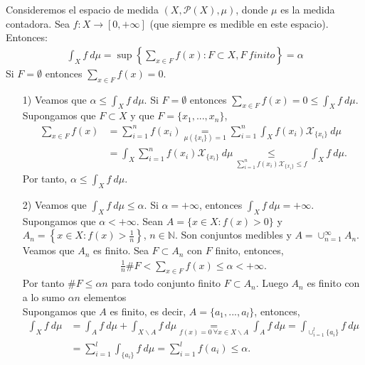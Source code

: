\begin{ejemplo}
Consideremos el espacio de medida $(X,\mathcal{P}(X),\mu)$, donde $\mu$ es la medida contadora. Sea $f: X \longrightarrow [0,+\infty]$ (que siempre es medible en este espacio). Entonces:
\begin{align*}
    \int_{X}{f \ d\mu} = \sup{\left\{ \sum_{x \in F}{f(x)} : F \subset X, F \ finito \right\}} = \alpha
\end{align*}
Si $F = \emptyset$ entonces $\sum_{x \in F}{f(x)} = 0$.
\begin{enumerate}
    \item[1)] Veamos que $\alpha \leq \int_{X}{f \ d\mu}$. Si $F = \emptyset$ entonces $\sum_{x \in F}{f(x)} = 0 \leq \int_{X}{f \ d\mu}$. Supongamos que $F \subset X$ y que $F = \{ x_1,...,x_n\}$,
    \begin{align*}
        \sum_{x \in F}{f(x)} &= \sum_{i = 1}^{n}{f(x_i)} \underset{\mu(\{x_i\}) = 1}{=} \sum_{i=1}^{n}{\int_{X}{f(x_i)\mathcal{X}_{\{x_i\}} \ d\mu}}\\
        &=\int_{X}{\sum_{i=1}^{n}{f(x_i)\mathcal{X}_{\{x_i\}}} \ d\mu} \underset{\sum_{i=1}^{n}{f(x_i)\mathcal{X}_{\{x_i\}}} \leq f}{ \leq} \int_{X}{f \ d\mu}.
    \end{align*}
    Por tanto, $\alpha \leq \int_{X}{f \ d\mu}$.
    \item[2)] Veamos que $\int_{X}{f \ d\mu} \leq \alpha$. Si $\alpha = +\infty$, entonces $\int_{X}{f \ d\mu} = +\infty$. Supongamos que $\alpha < +\infty$. Sean $A = \{x \in X : f(x) >0\}$ y $A_n = \left\{ x \in X : f(x) > \frac{1}{n}\right\}$, $n \in \mathbb{N}$. Son conjuntos medibles y $A = \cup_{n=1}^{\infty}{A_n}$. Veamos que $A_n$ es finito. Sea $F \subset A_n$ con $F$ finito, entonces,
    \begin{align*}
        \frac{1}{n}\#F < \sum_{x \in F}{f(x)} \leq \alpha < +\infty.
    \end{align*}
    Por tanto $\#F \leq \alpha n$ para todo conjunto finito $F \subset A_n$. Luego $A_n$ es finito con a lo sumo $\alpha n$ elementos
    \\
    \newline
    Supongamos que $A$ es finito, es decir, $A = \{a_1,...,a_l\}$, entonces,
    \begin{align*}
        \int_{X}{f \ d\mu} &= \int_{A}{f \ d\mu} + \int_{X \backslash A}{f \ d\mu} \underset{f(x) = 0 \ \forall x \in X \backslash A}{=} \int_{A}{f \ d\mu} = \int_{\cup_{i=1}^{l}{\{a_i\}}}{{f \ d\mu}}\\
        &= \sum_{i=1}^{l}{\int_{\{a_i\}}{f \ d\mu}} = \sum_{i=1}^{l}{f(a_i)} \leq \alpha.

\end{align*}
\end{enumerate}
\end{ejemplo}
